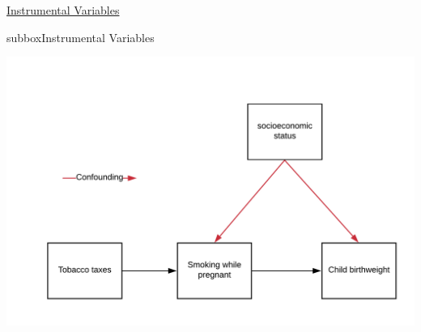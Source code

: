\begin{textbox}{\href{https://compneuro.neuromatch.io/tutorials/W3D5_NetworkCausality/student/W3D5_Tutorial4.html}{Instrumental Variables }   }
\begin{subbox}{subbox}{Instrumental Variables}
\begin{center}
\includegraphics[scale=0.15]{Figures/NC/NC_Figure18.png}

\end{center}
\end{subbox}
\end{textbox}
